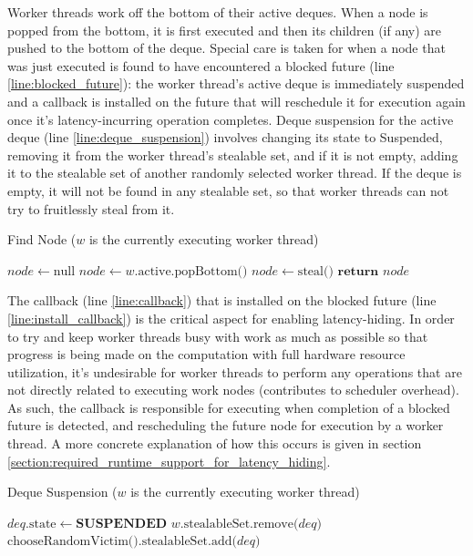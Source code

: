 \documentclass[bsc,frontabs,singlespacing,parskip,deptreport,normalheadings]{infthesis}
\begin{document}
Worker threads work off the bottom of their active deques. When a node is popped
from the bottom, it is first executed and then its children (if any) are pushed
to the bottom of the deque. Special care is taken for when a node that was just
executed is found to have encountered a blocked future (line
\ref{line:blocked_future}): the worker thread's active deque is immediately
suspended and a callback is installed on the future that will reschedule it for
execution again once it's latency-incurring operation completes. Deque
suspension for the active deque (line \ref{line:deque_suspension}) involves
changing its state to Suspended, removing it from the worker thread's stealable
set, and if it is not empty, adding it to the stealable set of another randomly
selected worker thread. If the deque is empty, it will not be found in any
stealable set, so that worker threads can not try to fruitlessly steal from it. 

\begin{algorithm}
\caption{Find Node ($w$ is the currently executing worker thread)}
\label{alg:find_node}
\begin{algorithmic}[1]
        \State $node \gets \text{null}$
            \State $node \gets w \text{.active.popBottom()}$
        \EndIf
         \label{line:no_work}
            \State $node \gets \text{steal()}$
        \EndIf
        \State $\textbf{return } node$
    \EndFunction
\end{algorithmic}
\end{algorithm}

The callback (line \ref{line:callback}) that is installed on the blocked future
(line \ref{line:install_callback}) is the critical aspect for enabling
latency-hiding. In order to try and keep worker threads busy with work as much
as possible so that progress is being made on the computation with full hardware
resource utilization, it's undesirable for worker threads to perform any
operations that are not directly related to executing work nodes (contributes to
scheduler overhead). As such, the callback is responsible for executing when
completion of a blocked future is detected, and rescheduling the future node for
execution by a worker thread. A more concrete explanation of how this occurs is
given in section \ref{section:required_runtime_support_for_latency_hiding}.

\begin{algorithm}
\caption{Deque Suspension ($w$ is the currently executing worker thread)}
\label{alg:suspend_and_find}
\begin{algorithmic}[1]
     \label{line:deque_suspension}
        \State $deq\text{.state} \gets \textbf{SUSPENDED}$
        \State $ w \text{.stealableSet.remove(} deq \text{)}$
            \State $ \text{chooseRandomVictim().stealableSet.add(} deq \text{)}$
        \EndIf
    \EndFunction
\end{algorithmic}
\end{algorithm}
\end{document}
